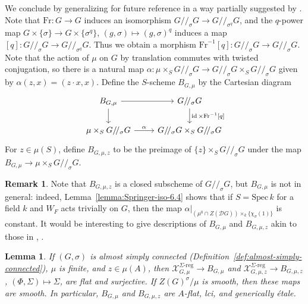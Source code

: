 \documentclass[11pt,reqno]{amsart}
\newtheorem{lemma}[theorem]{Lemma}
\theoremstyle{definition}
\newtheorem{remark}[theorem]{Remark}
\renewcommand{\rm}{\mathrm}
\newcommand{\Spec}{\mathrm{Spec} \,}
\newcommand{\sD}{{\mathscr D}}
\newcommand{\sX}{{\mathscr X}}
\DeclareMathOperator{\id}{id}
\begin{document}
We conclude by generalizing \cite[Theorem 3.7]{Shotton-irreducible} for future reference in a way partially suggested by \cite[Remark 3.9]{Shotton-irreducible}. Note that $\rm{Fr}\colon G \to G$ induces an isomorphism $G/\!/_\sigma G \to G/\!/_{\sigma^q} G$, and the $q$-power map $G \times \{\sigma\} \to G \times \{\sigma^q\}$, $(g, \sigma) \mapsto (g, \sigma)^q$ induces a map $[q]\colon G/\!/_\sigma G \to G/\!/_{\sigma^q} G$. Thus we obtain a morphism $\rm{Fr}^{-1}[q]\colon G/\!/_\sigma G \to G/\!/_\sigma G$. Note that the action of $\mu$ on $G$ by translation commutes with twisted conjugation, so there is a natural map $\alpha\colon \mu \times_S G/\!/_\sigma G \to G/\!/_\sigma G \times_S G/\!/_\sigma G$ given by $\alpha(z, x) = (z\cdot x, x)$. Define the $S$-scheme $B_{G, \mu}$ by the Cartesian diagram
\[
\begin{tikzcd}
    B_{G, \mu} \arrow[d] \arrow[r]
        &G/\!/_\sigma G \arrow[d, "\id \times \mathrm{Fr}^{-1}{[q]}"] \\
    \mu \times_S G/\!/_\sigma G \arrow[r, "\alpha"]
        &G/\!/_\sigma G \times_S G/\!/_\sigma G
\end{tikzcd}
\]
For $z \in \mu(S)$, define $B_{G, \mu, z}$ to be the preimage of $\{z\} \times_S G/\!/_\sigma G$ under the map $B_{G, \mu} \to \mu \times_S G/\!/_\sigma G$.

\begin{remark}
    Note that $B_{G, \mu, z}$ is a closed subscheme of $G/\!/_\sigma G$, but $B_{G, \mu}$ is not in general: indeed, Lemma~\ref{lemma:Springer-iso-6.4} shows that if $S = \Spec k$ for a field $k$ and $W_F$ acts trivially on $G$, then the map $\alpha|_{(\mu^0 \cap Z(\sD G)) \times_k \{\chi_\sigma(1)\}}$ is constant. It would be interesting to give descriptions of $B_{G,\mu}$ and $B_{G,\mu,z}$ akin to those in \cite{Li-GG}, \cite{Li-Shotton}.
\end{remark}

\begin{lemma}\label{lemma:shotton-smooth}
    If $(G, \sigma)$ is almost simply connected (Definition~\ref{def:almost-simply-connected}), $\mu$ is finite, and $z \in \mu(A)$, then $\sX_{G, \mu}^{\Sigma\textrm{-}\mathrm{reg}} \to B_{G, \mu}$ and $\sX_{G, \mu, z}^{\Sigma\textrm{-}\mathrm{reg}} \to B_{G, \mu, z}$, $(\Phi, \Sigma) \mapsto \Sigma$, are flat and surjective. If $Z(G)^\sigma/\mu$ is smooth, then these maps are smooth. In particular, $B_{G, \mu}$ and $B_{G, \mu, z}$ are $A$-flat, lci, and generically \'etale.
\end{lemma}
\end{document}
